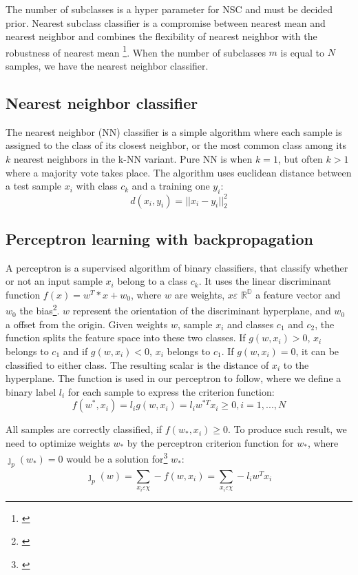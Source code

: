 \documentclass[journal]{IEEEtran}
\begin{document}
The number of subclasses is a hyper parameter for NSC and must be decided prior. Nearest subclass classifier is a compromise between nearest mean and nearest neighbor and combines the flexibility of nearest neighbor with the robustness of nearest mean \footnote{\cite{Veenman2005}}. When the number of subclasses $m$ is equal to $N$ samples, we have the nearest neighbor classifier.

\subsection{Nearest neighbor classifier}

The nearest neighbor (NN) classifier is a simple algorithm where each sample is assigned to the class of its closest neighbor, or the most common class among its $k$ nearest neighbors in the k-NN variant. Pure NN is when $k=1$, but often $k>1$ where a majority vote takes place. The algorithm uses euclidean distance between a test sample $x_{i}$ with class $c_{k}$ and a training one $y_{i}$: $$ d(x_{i},y_{i}) = ||x_{i}-y_{i}||^2_{2} $$

\subsection{Perceptron learning with backpropagation}

A perceptron is a supervised algorithm of binary classifiers, that classify whether or not an input sample $x_{i}$ belong to a class $c_{k}$. It uses the linear discriminant function $f(x) = w^T*x + w_{0}$, where $w$ are weights, $x\varepsilon$ $\mathbb{R^D}$ a feature vector and $w_{0}$ the bias\footnote{\cite{Iosifidis2017}}. $w$ represent the orientation of the discriminant hyperplane, and $w_{0}$ a offset from the origin. Given weights $w$, sample $x_{i}$ and classes $c_{1}$ and $c_{2}$, the function splits the feature space into these two classes. If $g(w,x_{i}) > 0$, $x_{i}$ belongs to $c_{1}$ and if $g(w,x_{i}) < 0$, $x_{i}$ belongs to $c_{1}$. If $g(w,x_{i}) = 0$, it can be classified to either class. The resulting scalar is the distance of $x_{i}$ to the hyperplane. The function is used in our perceptron to follow, where we define a binary label $l_{i}$ for each sample to express the criterion function: $$ f(w^*,x_{i}) = l_{i} g(w,x_{i}) = l_{i} w^{*T} x_{i} \geq 0, i = 1, ..., N $$

All samples are correctly classified, if $f(w_{*}, x_{i}) \geq 0$. To produce such result, we need to optimize weights $w_{*}$ by the perceptron criterion function for $w_{*}$, where ${\jmath}_{p}(w_{*}) = 0$ would be a solution for\footnote{\cite{Iosifidis2017}} $w_{*}$: $$ {\jmath}_{p}(w) = \sum_{x_{i} \varepsilon \chi}^{} -f(w,x_{i}) = \sum_{x_{i} \varepsilon \chi}^{} -l_{i} w^T x_{i} $$
\end{document}
